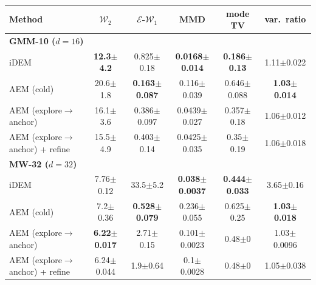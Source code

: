 \begin{tabular}{lccccc}
\toprule
Method & $\mathcal{W}_2$ & $\mathcal{E}$-$\mathcal{W}_1$ & MMD & mode TV & var.\ ratio \\
\midrule
\multicolumn{6}{l}{\textbf{GMM-10 ($d{=}16$)}}\\
iDEM & \textbf{12.3{\scriptsize$\pm$4.2}} & 0.825{\scriptsize$\pm$0.18} & \textbf{0.0168{\scriptsize$\pm$0.014}} & \textbf{0.186{\scriptsize$\pm$0.13}} & 1.11{\scriptsize$\pm$0.022} \\  %
AEM (cold) & 20.6{\scriptsize$\pm$1.8} & \textbf{0.163{\scriptsize$\pm$0.087}} & 0.116{\scriptsize$\pm$0.039} & 0.646{\scriptsize$\pm$0.088} & \textbf{1.03{\scriptsize$\pm$0.014}} \\  %
AEM (explore$\to$anchor) & 16.1{\scriptsize$\pm$3.6} & 0.386{\scriptsize$\pm$0.097} & 0.0439{\scriptsize$\pm$0.027} & 0.357{\scriptsize$\pm$0.18} & 1.06{\scriptsize$\pm$0.012} \\  %
AEM (explore$\to$anchor) + refine & 15.5{\scriptsize$\pm$4.9} & 0.403{\scriptsize$\pm$0.14} & 0.0425{\scriptsize$\pm$0.035} & 0.35{\scriptsize$\pm$0.19} & 1.06{\scriptsize$\pm$0.018} \\  %
\midrule
\multicolumn{6}{l}{\textbf{MW-32 ($d{=}32$)}}\\
iDEM & 7.76{\scriptsize$\pm$0.12} & 33.5{\scriptsize$\pm$5.2} & \textbf{0.038{\scriptsize$\pm$0.0037}} & \textbf{0.444{\scriptsize$\pm$0.033}} & 3.65{\scriptsize$\pm$0.16} \\  %
AEM (cold) & 7.2{\scriptsize$\pm$0.36} & \textbf{0.528{\scriptsize$\pm$0.079}} & 0.236{\scriptsize$\pm$0.055} & 0.625{\scriptsize$\pm$0.25} & \textbf{1.03{\scriptsize$\pm$0.018}} \\  %
AEM (explore$\to$anchor) & \textbf{6.22{\scriptsize$\pm$0.017}} & 2.71{\scriptsize$\pm$0.15} & 0.101{\scriptsize$\pm$0.0023} & 0.48{\scriptsize$\pm$0} & 1.03{\scriptsize$\pm$0.0096} \\  %
AEM (explore$\to$anchor) + refine & 6.24{\scriptsize$\pm$0.044} & 1.9{\scriptsize$\pm$0.64} & 0.1{\scriptsize$\pm$0.0028} & 0.48{\scriptsize$\pm$0} & 1.05{\scriptsize$\pm$0.038} \\  %
\bottomrule
\end{tabular}
